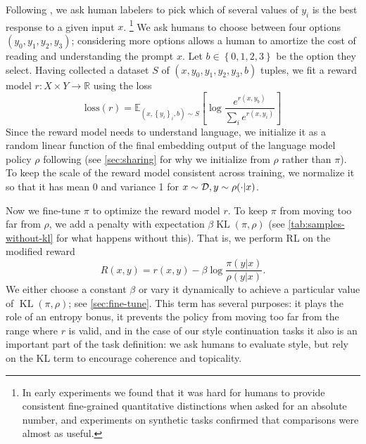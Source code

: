 \documentclass{article}
\newcommand{\KL}{\operatorname{KL}}
\newcommand{\E}[2]{\mathbb{E}_{#1}\left[#2\right]}
\begin{document}
Following \citet{christiano2017deep}, we ask human labelers
to pick which of several values of $y_i$ is the best response to a given input $x$.%
\footnote{In early experiments we found that it was hard for humans to provide consistent fine-grained quantitative distinctions when asked for an absolute number,
and experiments on synthetic tasks confirmed that comparisons were almost as useful.}
We ask humans to choose between four options $(y_0, y_1, y_2, y_3)$; considering more options allows a human to amortize the cost
of reading and understanding the prompt $x$.
Let $b \in \left\{0, 1, 2, 3\right\}$
be the option they select.
Having collected a dataset $S$ of $(x, y_0, y_1, y_2, y_3, b)$ tuples,
we fit a reward model $r : X \times Y \rightarrow \mathbb{R}$
using the loss
\begin{equation}\label{eq:rploss}\textrm{loss}(r) = \E{\left(x, \left\{y_i\right\}_i, b\right) \sim S}{\log {\frac {e^{r(x, y_b)}}{\sum_i e^{r(x, y_i)}}}}\end{equation}
Since the reward model needs to understand language,
we initialize it as a random linear function of the final embedding output of the language model policy $\rho$
following \citet{radford2018improving} (see \cref{sec:sharing} for why we initialize from $\rho$ rather than $\pi$).
To keep the scale of the reward model consistent across training,
we normalize it so that it has mean 0 and variance 1 for $x \sim \mathcal{D}, y \sim \rho(\cdot|x)$.

Now we fine-tune $\pi$ to optimize the reward model $r$.
To keep $\pi$ from moving too far from $\rho$,
we add a penalty with expectation $\beta \KL(\pi,\rho)$ (see \cref{tab:samples-without-kl} for what happens without this).
That is, we perform RL on the modified reward
\begin{equation}\label{eq:rewarddef}
R(x, y) = r(x, y) - \beta \log \frac {\pi(y|x)}{\rho(y|x)}.
\end{equation}
We either choose a constant $\beta$ or vary it dynamically to achieve a particular value of $\KL(\pi,\rho)$; see \cref{sec:fine-tune}.
This term has several purposes: it plays the role of an entropy bonus,
it prevents the policy from moving too far from the range where $r$
is valid, and in the case of our style continuation tasks
it also is an important part of the task definition:
we ask humans to evaluate style,
but rely on the KL term to encourage coherence and topicality.
\end{document}
